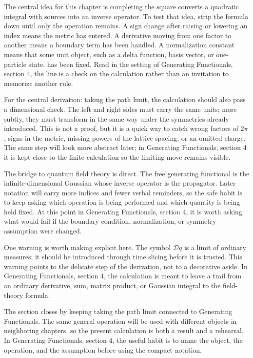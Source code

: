 The central idea for this chapter is completing the square converts a quadratic integral with sources into an inverse operator.  To test that idea, strip the formula down until only the operation remains.  A sign change after raising or lowering an index means the metric has entered.  A derivative moving from one factor to another means a boundary term has been handled.  A normalization constant means that some unit object, such as a delta function, basis vector, or one-particle state, has been fixed.  Read in the setting of Generating Functionals, section 4, the line is a check on the calculation rather than an invitation to memorize another rule.

For the central derivation: taking the path limit, the calculation should also pass a dimensional check.  The left and right sides must carry the same units; more subtly, they must transform in the same way under the symmetries already introduced.  This is not a proof, but it is a quick way to catch wrong factors of \(2\pi\), signs in the metric, missing powers of the lattice spacing, or an omitted charge.  The same step will look more abstract later; in Generating Functionals, section 4 it is kept close to the finite calculation so the limiting move remains visible.

The bridge to quantum field theory is direct.  The free generating functional is the infinite-dimensional Gaussian whose inverse operator is the propagator.  Later notation will carry more indices and fewer verbal reminders, so the safe habit is to keep asking which operation is being performed and which quantity is being held fixed.  At this point in Generating Functionals, section 4, it is worth asking what would fail if the boundary condition, normalization, or symmetry assumption were changed.

One warning is worth making explicit here.  The symbol \(\mathcal D q\) is a limit of ordinary measures; it should be introduced through time slicing before it is trusted.  This warning points to the delicate step of the derivation, not to a decorative aside.  In Generating Functionals, section 4, the calculation is meant to leave a trail from an ordinary derivative, sum, matrix product, or Gaussian integral to the field-theory formula.

The section closes by keeping taking the path limit connected to Generating Functionals.  The same general operation will be used with different objects in neighboring chapters, so the present calculation is both a result and a rehearsal.  In Generating Functionals, section 4, the useful habit is to name the object, the operation, and the assumption before using the compact notation.



